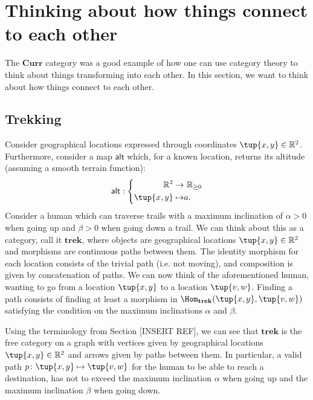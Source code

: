 \section{Thinking about how things connect to each other}
The $\mathbf{Curr}$ category was a good example of how one can use category theory to think about things transforming into each other. In this section, we want to think about how things connect to each other.
\subsection{Trekking}
\label{sec:trekking}
Consider geographical locations expressed through coordinates $\tup{x,y}\in \mathbb{R}^2$. Furthermore, consider a map $\mathsf{alt}$ which, for a known location, returns its altitude (assuming a smooth terrain function):
\begin{equation}
 \mathsf{alt}: \left \{
    \begin{aligned}
    \mathbb{R}^2 \to & \ \mathbb{R}_{\geq 0} \\
    \tup{x,y} \mapsto & a.
    \end{aligned}
\right .
\end{equation}
Consider a human which can traverse trails with a maximum inclination of $\alpha>0$ when going up and $\beta>0$ when going down a trail. We can think about this as a category, call it $\mathbf{trek}$, where objects are geographical locations $\tup{x,y}\in \mathbb{R}^2$ and morphisms are continuous paths between them. The identity morphism for each location consists of the trivial path (i.e. not moving), and composition is given by concatenation of paths. We can now think of the aforementioned human, wanting to go from a location $\tup{x,y}$ to a location $\tup{v,w}$. Finding a path consists of finding at least a morphism in $\Hom_\mathbf{trek}(\tup{x,y},\tup{v,w})$ satisfying the condition on the maximum inclinations $\alpha$ and $\beta$.



Using the terminology from Section [INSERT REF], we can see that $\mathbf{trek}$ is the free category on a graph with vertices given by geographical locations $\tup{x,y}\in \mathbb{R}^2$ and arrows given by paths between them. In particular, a valid path $p\colon \tup{x,y}\mapsto \tup{v,w}$ for the human to be able to reach a destination, has not to exceed the maximum inclination $\alpha$ when going up and the maximum inclination $\beta$ when going down.


